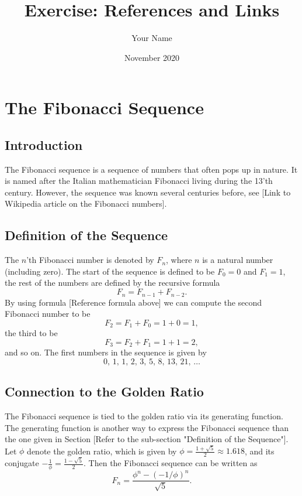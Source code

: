 \documentclass{article}
\title{Exercise: References and Links}
\author{Your Name}
\date{November 2020}
\begin{document}
\maketitle

\section{The Fibonacci Sequence}
\subsection{Introduction}
The Fibonacci sequence is a sequence of numbers that often pops up in nature. It is named after the Italian mathematician Fibonacci living during the 13'th century. However, the sequence was known several centuries before, see [Link to Wikipedia article on the Fibonacci numbers].

\subsection{Definition of the Sequence}
The $n$'th Fibonacci number is denoted by $F_{n}$, where $n$ is a natural number (including zero). The start of the sequence is defined to be $F_{0}=0$ and $F_{1}=1$, the rest of the numbers are defined by the recursive formula 
\begin{equation}
    F_{n}=F_{n-1}+F_{n-2}.
\end{equation}
By using formula [Reference formula above] we can compute the second Fibonacci number to be 
\[F_2=F_1+F_0=1+0=1,\]
the third to be 
\[F_3=F_2+F_1=1+1=2,\]
and so on.
The first numbers in the sequence is given by
\[0,\, 1,\, 1,\, 2,\, 3,\, 5,\, 8,\, 13,\, 21,\, \dots \]
\subsection{Connection to the Golden Ratio}
The Fibonacci sequence is tied to the golden ratio via its generating function. The generating function is another way to express the Fibonacci sequence than the one given in Section [Refer to the sub-section "Definition of the Sequence"]. Let $\phi$ denote the golden ratio, which is given by $\phi=\frac{1+\sqrt{5}}{2} \approx 1.618$, and its conjugate $-\frac{1}{\phi}=\frac{1-\sqrt{5}}{2}$. Then the Fibonacci sequence can be written as 
\[F_n = \frac{\phi^n-(-1/\phi)^n}{\sqrt{5}}.\]
\end{document}
